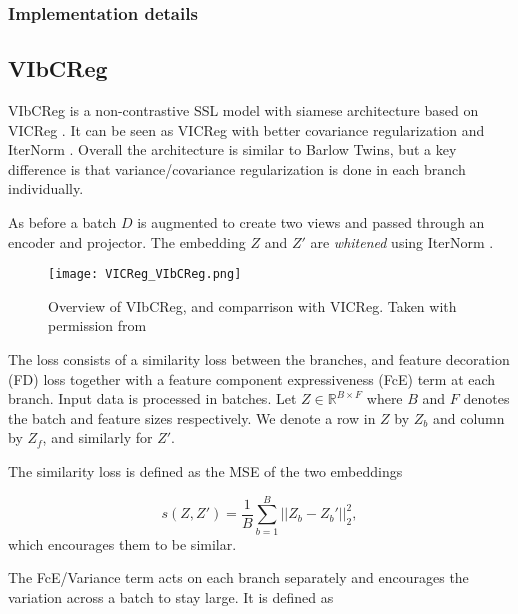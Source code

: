 \documentclass[../../thesis.tex]{subfiles}
\begin{document}
\subsubsection{Implementation details}



\subsection{VIbCReg}

VIbCReg \cite{lee2024vibcreg} is a non-contrastive SSL model with siamese architecture based on VICReg \cite{bardes2022vicreg}. It can be seen as VICReg with better covariance regularization and IterNorm \cite{huang2019iterative}. Overall the architecture is similar to Barlow Twins, but a key difference is that variance/covariance regularization is done in each branch individually.\newline

As before a batch $D$ is augmented to create two views and passed through an encoder and projector. The embedding $Z$ and $Z'$ are \textit{whitened}  using IterNorm \cite{huang2019iterative}.\newline

\begin{figure}[h]
    \texttt{[image: VICReg\_VIbCReg.png]}
    \centering    
    \caption{Overview of VIbCReg, and comparrison with VICReg. Taken with permission from \cite{lee2024computer}}
\end{figure}

The loss consists of a similarity loss between the branches, and feature decoration (FD) loss together with a feature component expressiveness (FcE) term at each branch. Input data is processed in batches. Let $Z \in \mathbb{R}^{B\times F}$ where $B$ and $F$ denotes the batch and feature sizes respectively. We denote a row in $Z$ by $Z_b$ and column by $Z_f$, and similarly for $Z'$. \newline

The similarity loss is defined as the MSE of the two embeddings

\begin{equation}
    s(Z,Z') = \frac{1}{B} \sum_{b=1}^B || Z_b-Z_b'||_2^2,
\end{equation}
which encourages them to be similar. 

The FcE/Variance term acts on each branch separately and encourages the variation across a batch to stay large. It is defined as 
\end{document}
